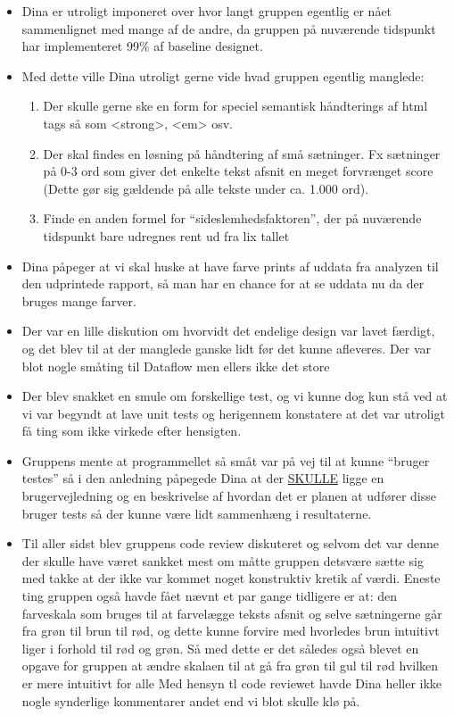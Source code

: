 \begin{itemize}

\item Dina er utroligt imponeret over hvor langt gruppen egentlig er nået sammenlignet med mange af de andre, da gruppen på nuværende tidspunkt har implementeret 99\% af baseline designet.

\item Med dette ville Dina utroligt gerne vide hvad gruppen egentlig manglede:

\begin{enumerate}
 \item Der skulle gerne ske en form for speciel semantisk håndterings af html tags så som <strong>, <em> osv.
\item Der skal findes en løsning på håndtering af små sætninger. Fx sætninger på 0-3 ord som giver det enkelte tekst afsnit en meget forvrænget score (Dette gør sig gældende på alle tekste under ca. 1.000 ord).
\item Finde en anden formel for ``sideslemhedsfaktoren'', der på nuværende tidspunkt bare udregnes rent ud fra lix tallet
\end{enumerate}

\item Dina påpeger at vi skal huske at have farve prints af uddata fra analyzen til den udprintede rapport, så man har en chance for at se uddata nu da der bruges mange farver.

\item Der var en lille diskution om hvorvidt det endelige design var lavet færdigt, og det blev til at der manglede ganske lidt før det kunne afleveres. Der var blot nogle småting til Dataflow men ellers ikke det store

\item Der blev snakket en smule om forskellige test, og vi kunne dog kun stå ved at vi var begyndt at lave unit tests og herigennem konstatere at det var utroligt få ting som ikke virkede efter hensigten.

\item Gruppens mente at programmellet så småt var på vej til at kunne ``bruger testes'' så i den anledning påpegede Dina at der \underline{SKULLE} ligge en brugervejledning og en beskrivelse af hvordan det er planen at udfører disse bruger tests så der kunne være lidt sammenhæng i resultaterne.

\item Til aller sidst blev gruppens code review diskuteret og selvom det var denne der skulle have været sankket mest om måtte gruppen detsvære sætte sig med takke at der ikke var kommet noget konstruktiv kretik af værdi.
Eneste ting gruppen også havde fået nævnt et par gange tidligere er at: den farveskala som bruges til at farvelægge teksts afsnit og selve sætningerne går fra grøn til brun til rød, og dette kunne forvire med hvorledes brun intuitivt liger i forhold til rød og grøn. Så med dette er det således også blevet en opgave for gruppen at ændre skalaen til at gå fra grøn til gul til rød hvilken er mere intuitivt for alle 
Med hensyn tl code reviewet havde Dina heller ikke nogle synderlige kommentarer andet end vi blot skulle klø på.

\end{itemize}

